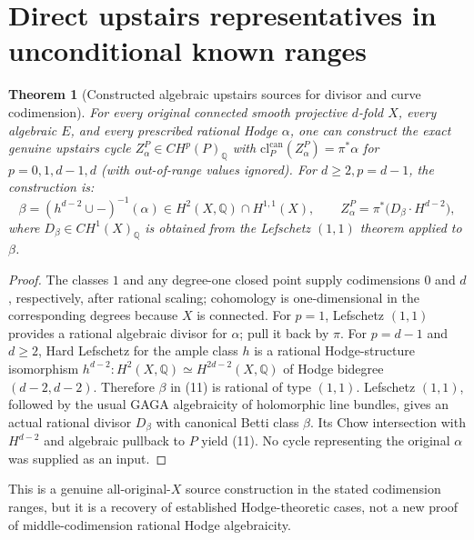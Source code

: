 \documentclass[11pt]{article}
\newtheorem{theorem}{Theorem}
\begin{document}
\section{Direct upstairs representatives in unconditional known ranges}
\begin{theorem}[Constructed algebraic upstairs sources for divisor and curve codimension]
For every original connected smooth projective \(d\)-fold \(X\),
every algebraic \(E\), and every prescribed rational Hodge
\(\alpha\), one can construct the exact genuine upstairs
cycle \(Z_\alpha^P\in CH^p(P)_{\mathbb Q}\) with
\(\mathrm{cl}_P^{\mathrm{can}}(Z_\alpha^P)=\pi^*\alpha\)
for \(p=0,1,d-1,d\) (with out-of-range values ignored).
For \(d\ge2,p=d-1\), the construction is:
\[
 \beta = (h^{d-2}\cup-)^{-1}(\alpha)
 \in H^2(X,\mathbb Q)\cap H^{1,1}(X),\qquad
 Z_\alpha^P =\pi^*\bigl(D_\beta\cdot H^{d-2}\bigr), \tag{11}
\]
where \(D_\beta\in CH^1(X)_{\mathbb Q}\) is obtained from
the Lefschetz \((1,1)\) theorem applied to \(\beta\).
\end{theorem}
\begin{proof}
The classes \(1\) and any degree-one closed point supply
codimensions \(0\) and \(d\), respectively, after rational
scaling; cohomology is one-dimensional in the corresponding
degrees because \(X\) is connected. For \(p=1\), Lefschetz
\((1,1)\) provides a rational algebraic divisor for \(\alpha\);
pull it back by \(\pi\). For \(p=d-1\) and \(d\ge2\),
Hard Lefschetz for the ample class \(h\) is a rational
Hodge-structure isomorphism
\(h^{d-2}:H^2(X,\mathbb Q)\simeq H^{2d-2}(X,\mathbb Q)\)
of Hodge bidegree \((d-2,d-2)\).
Therefore \(\beta\) in (11) is rational of type \((1,1)\).
Lefschetz \((1,1)\), followed by the usual GAGA algebraicity
of holomorphic line bundles, gives an actual rational divisor
\(D_\beta\) with canonical Betti class \(\beta\).
Its Chow intersection with \(H^{d-2}\) and algebraic pullback
to \(P\) yield (11). No cycle representing the original
\(\alpha\) was supplied as an input.
\end{proof}
This is a genuine all-original-\(X\) source construction
in the stated codimension ranges, but it is a recovery of
established Hodge-theoretic cases, not a new proof of
middle-codimension rational Hodge algebraicity.
\end{document}

